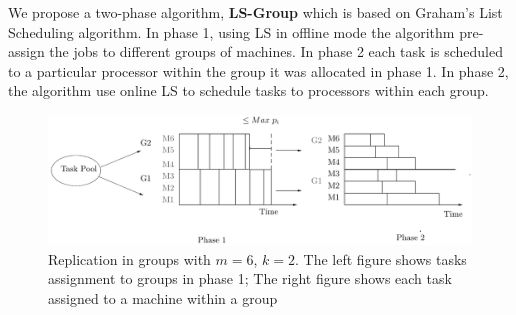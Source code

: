 \documentclass[10pt, conference, compsocconf]{IEEEtran}
\begin{document}
 We propose a two-phase algorithm, \textbf{LS-Group} which is based on Graham's List Scheduling algorithm. In phase 1, using LS in offline mode the algorithm pre-assign the jobs to different groups of machines. In phase 2 each task is scheduled to a particular processor within the group it was allocated in phase 1. In phase 2, the algorithm use online LS to schedule tasks to processors within each group.\\

\begin{figure}[htp] 
\centering
\includegraphics[width= 16 cm]{model3.pdf}
\caption{Replication in groups with $m = 6$, $k = 2$. The left figure shows tasks assignment to groups in phase 1; The right figure shows each task
assigned to a machine within a group}
\label{fig:Model 3}
\end{figure}
\end{document}
